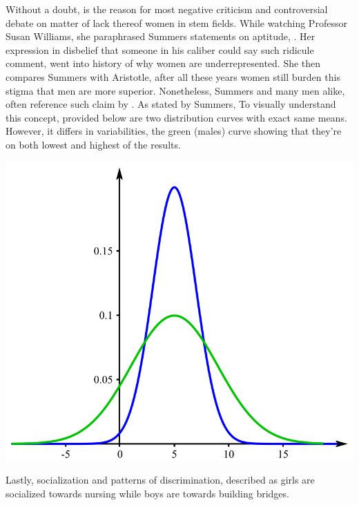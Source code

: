 \par
Without a doubt,  is the reason for most negative 
criticism and controversial debate on matter of lack thereof women in stem fields. While watching
Professor Susan Williams, she paraphrased Summers statements on aptitude, \cite{williams}.
Her expression in disbelief that someone in his caliber could say such ridicule comment, went into
history of why women are underrepresented. She then compares Summers with Aristotle, after all these
years women still burden this stigma that men are more superior. Nonetheless, Summers and many men
alike, often reference such claim by . As stated by Summers,
\cite{summers} To visually understand this
concept, provided below are two distribution curves with exact same means. However, it differs in
variabilities, the green (males) curve showing that they're on both lowest and highest
of the results.

\centering\includegraphics[scale=0.4]{normaldis.png}\\[1cm]


\par
Lastly, socialization and patterns of discrimination, described as girls are socialized
towards nursing while boys are towards building bridges.

\clearpage